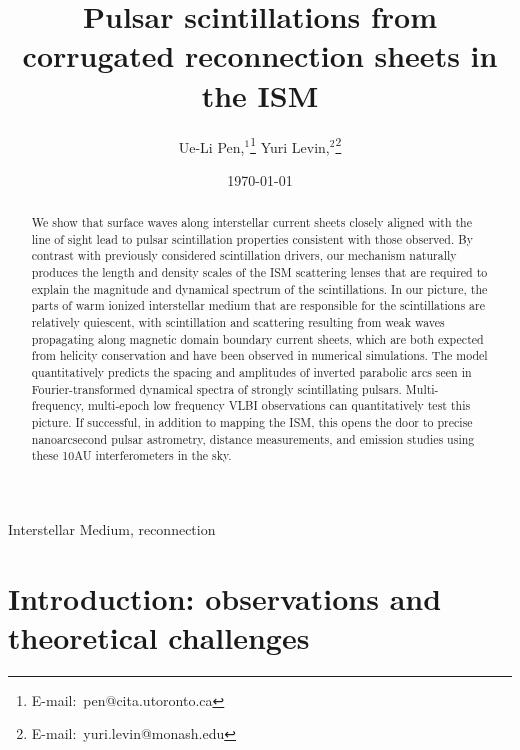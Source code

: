 \documentclass[useAMS,usenatbib]{mn2e}
\title[Interstellar Plasma Scattering]{
Pulsar scintillations from corrugated reconnection sheets in the ISM
}
\author[Pen and Levin]{Ue-Li
  Pen,$^{1}$\thanks{E-mail:\ pen@cita.utoronto.ca}
Yuri Levin,$^2$\thanks{E-mail:\ yuri.levin@monash.edu}
}
\begin{document}
\date{\today}

\pagerange{\pageref{firstpage}--\pageref{lastpage}} 

\maketitle
\label{firstpage}
\begin{abstract}

We show that surface waves along interstellar current sheets closely
aligned with the line of sight lead to pulsar scintillation properties
consistent with those observed.  By contrast with previously
considered scintillation drivers, our mechanism naturally produces the
length and density scales of the ISM scattering lenses that are
required to explain the magnitude and dynamical spectrum of the
scintillations.  In our picture, the parts of warm ionized
interstellar medium that are responsible for the scintillations are
relatively quiescent, with scintillation and scattering resulting from
weak waves propagating along magnetic domain boundary current sheets,
which are both expected from helicity conservation and have been
observed in numerical simulations.  The model quantitatively predicts
the spacing and amplitudes of inverted parabolic arcs seen in
Fourier-transformed dynamical spectra of strongly scintillating
pulsars. Multi-frequency, multi-epoch low frequency VLBI observations
can quantitatively test this picture.  If successful, in addition to
mapping the ISM, this opens the door to precise nanoarcsecond pulsar
astrometry, distance measurements, and emission studies using these
10AU interferometers in the sky.

\end{abstract}
\begin{keywords}
Interstellar Medium, reconnection
\end{keywords}

\newcommand{\be}{\begin{eqnarray}}
\newcommand{\ee}{\end{eqnarray}}
\newcommand{\beq}{\begin{equation}}
\newcommand{\eeq}{\end{equation}}

\section{Introduction: observations and theoretical challenges}
\end{document}
